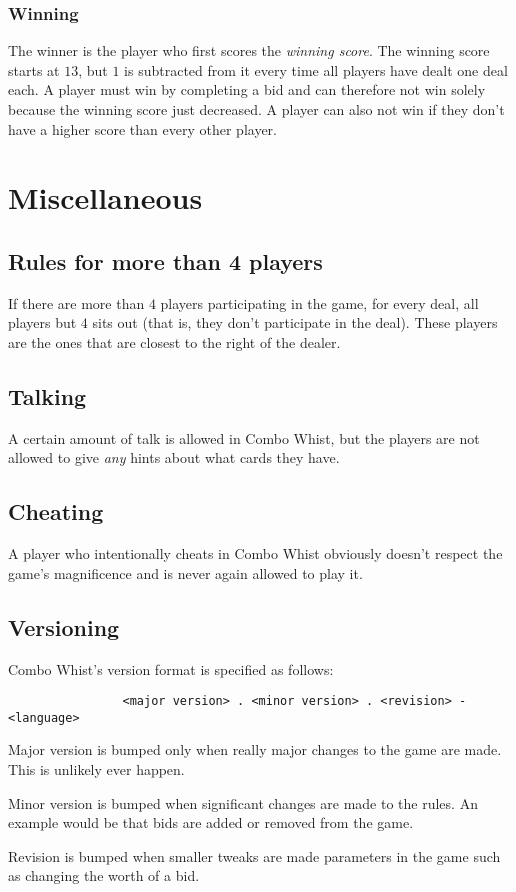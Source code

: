 \documentclass[a4paper]{article}
\begin{document}
{{			\subsubsection{Winning}{%
				The winner is the player who first scores the \emph{winning score}. The winning score starts at $13$, but $1$ is subtracted from it every time all players have dealt one deal each. A player must win by completing a bid and can therefore not win solely because the winning score just decreased. A player can also not win if they don't have a higher score than every other player.
			}
		}
	}

	\section{Miscellaneous}{%
		\subsection{Rules for more than 4 players}{%
			If there are more than $4$ players participating in the game, for every deal, all players but $4$ sits out (that is, they don't participate in the deal). These players are the ones that are closest to the right of the dealer.
			
			
		}
		
		\subsection{Talking}{%
			A certain amount of talk is allowed in Combo Whist, but the players are not allowed to give \emph{any} hints about what cards they have.
		}
		
		\subsection{Cheating}{%
			A player who intentionally cheats in Combo Whist obviously doesn't respect the game's magnificence and is never again allowed to play it.
		}

		\subsection{Versioning}{%
			Combo Whist's version format is specified as follows:
			\begin{verbatim}
				<major version> . <minor version> . <revision> - <language>
			\end{verbatim}

			Major version is bumped only when really major changes to the game are made. This is unlikely ever happen.

			Minor version is bumped when significant changes are made to the rules. An example would be that bids are added or removed from the game.

			Revision is bumped when smaller tweaks are made parameters in the game such as changing the worth of a bid.
		}
	}

	\pagebreak
	
	
\end{document}
